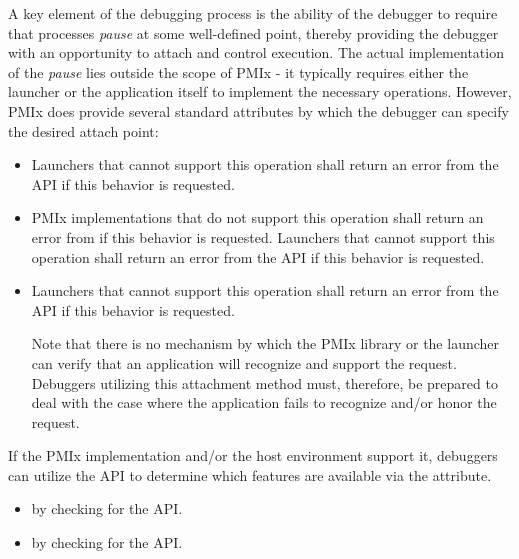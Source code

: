 {A key element of the debugging process is the ability of the debugger to require that processes \emph{pause} at some well-defined point, thereby providing the debugger with an opportunity to attach and control execution. The actual implementation of the \emph{pause} lies outside the scope of \ac{PMIx} - it typically requires either the launcher or the application itself to implement the necessary operations. However, \ac{PMIx} does provide several standard attributes by which the debugger can specify the desired attach point:

\begin{itemize}
    \item {}Launchers that cannot support this operation shall return an error from the  \ac{API} if this behavior is requested.
    \pasteAttributeItemEnd{}
    \item {}\ac{PMIx} implementations that do not support this operation shall return an error from  if this behavior is requested. Launchers that cannot support this operation shall return an error from the  \ac{API} if this behavior is requested.
    \pasteAttributeItemEnd{}
    \item {}Launchers that cannot support this operation shall return an error from the  \ac{API} if this behavior is requested.

    Note that there is no mechanism by which the \ac{PMIx} library or the launcher can verify that an application will recognize and support the  request. Debuggers utilizing this attachment method must, therefore, be prepared to deal with the case where the application fails to recognize and/or honor the request.
    \pasteAttributeItemEnd{}
\end{itemize}

If the \ac{PMIx} implementation and/or the host environment support it, debuggers can utilize the  \ac{API} to determine which features are available via the  attribute.

\begin{itemize}
    \item {} by checking  for the  \ac{API}.
    \item {} by checking  for the  \ac{API}.
\end{itemize}

}
